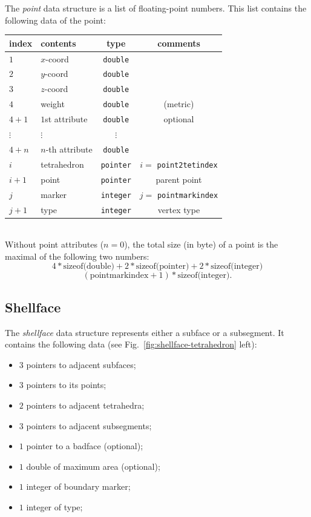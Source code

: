 The {\it point} data structure is a list of floating-point numbers. This list contains the following data of the point:\\
\begin{tabular}{l | l | c | c}
 index & contents & type & comments\\ \hline
 $1$ & $x$-coord & {\tt double} & \\
 $2$ & $y$-coord & {\tt double} & \\
 $3$ & $z$-coord & {\tt double} & \\ \hline
 $4$ & weight    & {\tt double} & (metric) \\ \hline
 $4 + 1$ & $1$st attribute & {\tt double} & optional \\
 $\vdots$ & $\vdots$ & $\vdots$ & \\
 $4 + n$ & $n$-th attribute & {\tt double} & \\ \hline
 $i$ & tetrahedron & {\tt pointer} & $i =$ {\tt point2tetindex} \\
 $i + 1$ & point & {\tt pointer} & parent point\\ \hline
 $j$ & marker & {\tt integer} & $j = $ {\tt pointmarkindex}\\
 $j + 1$ & type & {\tt integer} & vertex type
\end{tabular}\\

Without point attributes ($n = 0$), the total size (in byte) of a point is the maximal of the following two numbers:
\[
  4 * \textrm{sizeof(double)} + 2 * \textrm{sizeof(pointer)} + 2 * \textrm{sizeof(integer)}
\]
\[
  (\textrm{pointmarkindex} + 1) * \textrm{sizeof(integer)}.
\]

\subsection{Shellface}

The {\it shellface} data structure represents either a subface or a subsegment. It contains the following data (see Fig.~\ref{fig:shellface-tetrahedron} left):
\begin{itemize}
\item $3$ pointers to adjacent subfaces;
\item $3$ pointers to its points;
\item $2$ pointers to adjacent tetrahedra;
\item $3$ pointers to adjacent subsegments;
\item $1$ pointer to a badface (optional);
\item $1$ double of maximum area (optional);
\item $1$ integer of boundary marker;
\item $1$ integer of type;
\end{itemize}

